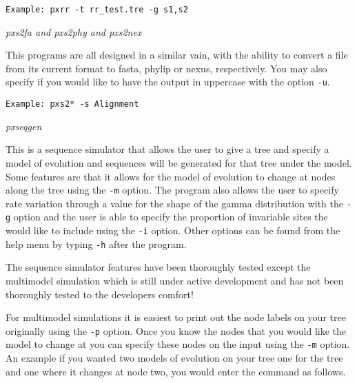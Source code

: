 \documentclass[12pt,letterpaper]{article}
\renewcommand{\subsection}[1]{%
\bigskip
\begin{center}
\begin{large}
\normalfont\itshape #1
\end{large}
\end{center}}
\begin{document}
\begin{flushleft}
\begin{verbatim}
Example: pxrr -t rr_test.tre -g s1,s2
\end{verbatim}
\end{flushleft}

\subsection{pxs2fa and pxs2phy and  pxs2nex}

This programs are all designed in a similar vain, with the ability to convert a file from its current format to fasta, phylip or nexus, respectively. You may also specify if you would like to have the output in uppercase with the option \texttt{-u}.


\begin{flushleft}
\begin{verbatim}
Example: pxs2* -s Alignment
\end{verbatim}
\end{flushleft}

\subsection{pxseqgen}

This is a sequence simulator that allows the user to give a tree and specify a model of evolution and sequences will be generated for that tree under the model. Some features are that it allows for the model of evolution to change at nodes along the tree using the \texttt{-m} option. The program also allows the user to specify rate variation through a value for the shape of the gamma distribution with the \texttt{-g} option and the user is able to specify the proportion of invariable sites the would like to include using the \texttt{-i} option. Other options can be found from the help menu by typing \texttt{-h} after the program.

The sequence simulator features have been thoroughly tested except the multimodel simulation which is still under active development and has not been thoroughly tested to the developers comfort!

For multimodel simulations it is easiest to print out the node labels on your tree originally using the \texttt{-p} option. Once you know the nodes that you would like the model to change at you can specify these nodes on the input using the \texttt{-m} option. An example if you wanted two models of evolution on your tree one for the tree and one where it changes at node two, you would enter the command as follows.
\end{document}
